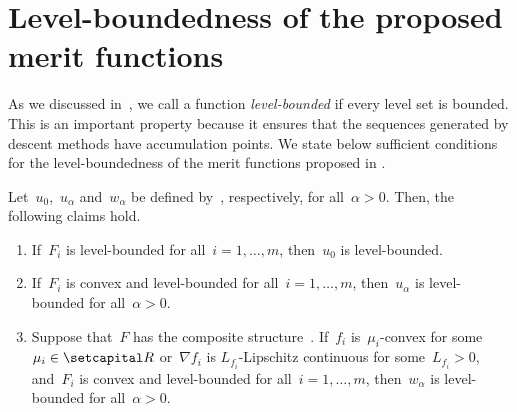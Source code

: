 \documentclass[../main]{subfiles}
\begin{document}
\section{Level-boundedness of the proposed merit functions} 
As we discussed in~, we call a function \emph{level-bounded} if every level set is bounded.
This is an important property because it ensures that the sequences generated by descent methods have accumulation points.
We state below sufficient conditions for the level-boundedness of the merit functions proposed in .
\begin{theorem} 
    Let~$u_0$,~$u_\alpha$ and~$w_\alpha$ be defined by~, respectively, for all~$\alpha > 0$.
    Then, the following claims hold.
    \begin{enumerate}
        \item If~$F_i$ is level-bounded for all~$i = 1, \dots, m$, then~$u_0$ is level-bounded. 
        \item If~$F_i$ is convex and level-bounded for all~$i = 1, \dots, m$, then~$u_\alpha$ is level-bounded for all~$\alpha > 0$. 
        \item Suppose that~$F$ has the composite structure~.
            If~$f_i$ is~$\mu_i$-convex for some~$\mu_i \in \setR$ or~$\nabla f_i$ is $L_{f_i}$-Lipschitz continuous for some~$L_{f_i} > 0$, and~$F_i$ is convex and level-bounded for all~$i = 1, \dots, m$, then~$w_\alpha$ is level-bounded for all~$\alpha > 0$. 
    \end{enumerate}
\end{theorem}
\end{document}
